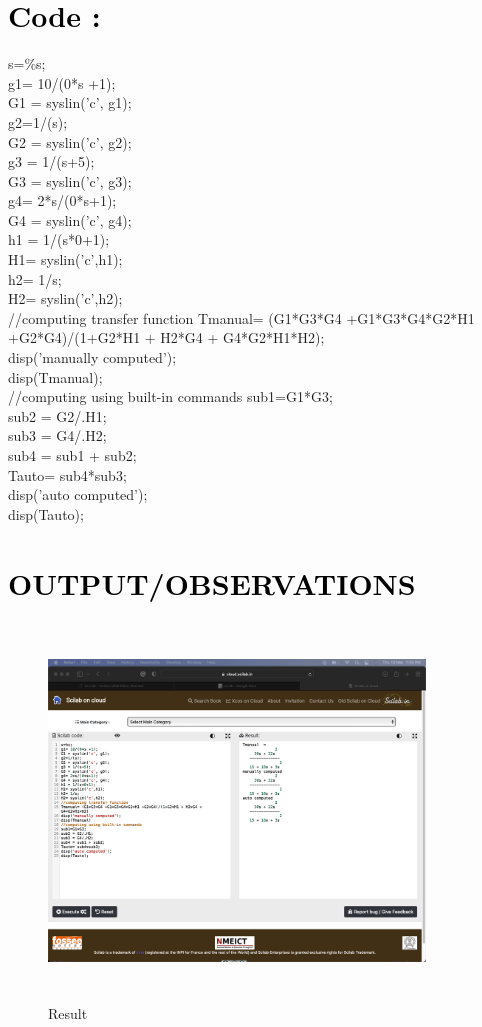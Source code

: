 \documentclass[12pt]{article}
\begin{document}
\section*{\textcolor{black}{Code :}}
s=\%s;\\
g1= 10/(0*s +1);\\
G1 = syslin('c', g1);\\
g2=1/(s);\\
G2 = syslin('c', g2);\\
g3 = 1/(s+5);\\
G3 = syslin('c', g3);\\
g4= 2*s/(0*s+1);\\
G4 = syslin('c', g4);\\
h1 = 1/(s*0+1);\\
H1= syslin('c',h1);\\
h2= 1/s;\\
H2= syslin('c',h2);\\
//computing transfer function
Tmanual= (G1*G3*G4 +G1*G3*G4*G2*H1 +G2*G4)/(1+G2*H1 + H2*G4 + G4*G2*H1*H2);\\
disp('manually computed');\\
disp(Tmanual);\\
//computing using built-in commands
sub1=G1*G3;\\
sub2 = G2/.H1;\\
sub3 = G4/.H2;\\
sub4 = sub1 + sub2;\\
Tauto= sub4*sub3;\\
disp('auto computed');\\
disp(Tauto);\\ \par 

\section*{\textcolor{black}{OUTPUT/OBSERVATIONS}}

\begin{figure}[!hth]
        \centering
        \includegraphics[width =10cm, height = 10cm]{images/exp101.png}
        \caption{Result}
        \label{Result}
\end{figure}
\end{document}

